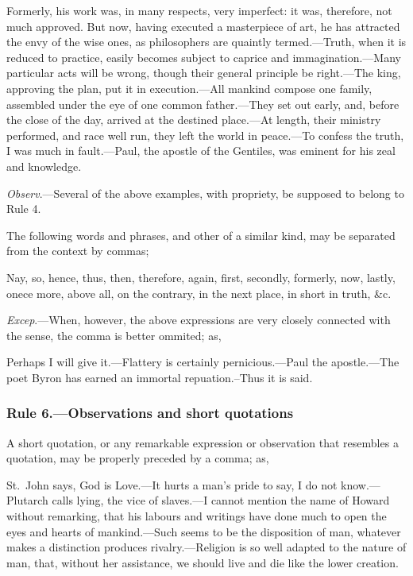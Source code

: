 \begin{example}
    Formerly, his work was, in many respects, very imperfect: it was, therefore,
    not much approved. But now, having executed a masterpiece of art, he has
    attracted the envy of the wise ones, as philosophers are quaintly
    termed.---Truth, when it is reduced to practice, easily becomes subject to
    caprice and immagination.---Many particular acts will be wrong, though their
    general principle be right.---The king, approving the plan, put it in
    execution.---All mankind compose one family, assembled under the eye of one
    common father.---They set out early, and, before the close of the day,
    arrived at the destined place.---At length, their ministry performed, and
    race well run, they left the world in peace.---To confess the truth, I was
    much in fault.---Paul, the apostle of the Gentiles, was eminent for his zeal
    and knowledge.
\end{example}

\emph{Observ}.---Several of the above examples, with propriety, be supposed to
belong to Rule 4.

The following words and phrases, and other of a similar kind, may be separated
from the context by commas;

\begin{example}
    Nay, so, hence, thus, then, therefore, again, first, secondly, formerly,
    now, lastly, onece more, above all, on the contrary, in the next place, in
    short in truth, \&c.
\end{example}

\emph{Excep}.---When, however, the above expressions are very closely connected
with the sense, the comma is better ommited; as,

\begin{example}
    Perhaps I will give it.---Flattery is certainly pernicious.---Paul the
    apostle.---The poet Byron has earned an immortal repuation.--Thus it is
    said.
\end{example}

\subsubsection{Rule 6.---Observations and short quotations}

A short quotation, or any remarkable expression or observation that resembles a
quotation, may be properly preceded by a comma; as,

\begin{example}
    St.\ John says, God is Love.---It hurts a man's pride to say, I do not
    know.---Plutarch calls lying, the vice of slaves.---I cannot mention the
    name of Howard without remarking, that his labours and writings have done
    much to open the eyes and hearts of mankind.---Such seems to be the
    disposition of man, whatever makes a distinction produces
    rivalry.---Religion is so well adapted to the nature of man, that, without
    her assistance, we should live and die like the lower creation.
\end{example}

